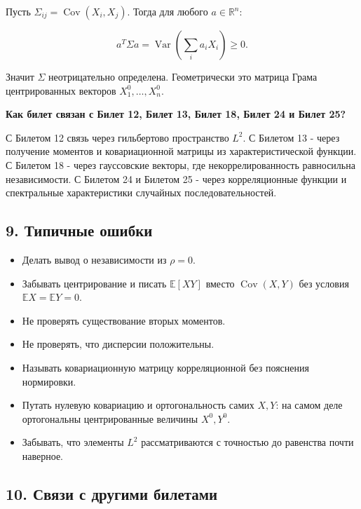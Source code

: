 \documentclass[
  11pt,
  a4paper,
]{article}
\providecommand{\tightlist}{%
  \setlength{\itemsep}{0pt}\setlength{\parskip}{0pt}}
\begin{document}
Пусть \(\Sigma_{ij}=\operatorname{Cov}(X_i,X_j)\). Тогда для любого
\(a\in\mathbb R^n\):

\[
a^T\Sigma a
=
\operatorname{Var}\left(\sum_i a_iX_i\right)
\ge0.
\]

Значит \(\Sigma\) неотрицательно определена. Геометрически это матрица
Грама центрированных векторов \(X_1^0,\ldots,X_n^0\).

\textbf{Как билет связан с Билет 12, Билет 13, Билет 18, Билет 24 и
Билет 25?}

С Билетом 12 связь через гильбертово пространство \(L^2\). С Билетом 13
- через получение моментов и ковариационной матрицы из
характеристической функции. С Билетом 18 - через гауссовские векторы,
где некоррелированность равносильна независимости. С Билетом 24 и
Билетом 25 - через корреляционные функции и спектральные характеристики
случайных последовательностей.

\subsection{9. Типичные
ошибки}\label{ux442ux438ux43fux438ux447ux43dux44bux435-ux43eux448ux438ux431ux43aux438}

\begin{itemize}
\tightlist
\item
  Делать вывод о независимости из \(\rho=0\).
\item
  Забывать центрирование и писать \(\mathbb E[XY]\) вместо
  \(\operatorname{Cov}(X,Y)\) без условия \(\mathbb EX=\mathbb EY=0\).
\item
  Не проверять существование вторых моментов.
\item
  Не проверять, что дисперсии положительны.
\item
  Называть ковариационную матрицу корреляционной без пояснения
  нормировки.
\item
  Путать нулевую ковариацию и ортогональность самих \(X,Y\): на самом
  деле ортогональны центрированные величины \(X^0,Y^0\).
\item
  Забывать, что элементы \(L^2\) рассматриваются с точностью до
  равенства почти наверное.
\end{itemize}

\subsection{10. Связи с другими
билетами}\label{ux441ux432ux44fux437ux438-ux441-ux434ux440ux443ux433ux438ux43cux438-ux431ux438ux43bux435ux442ux430ux43cux438}
\end{document}
